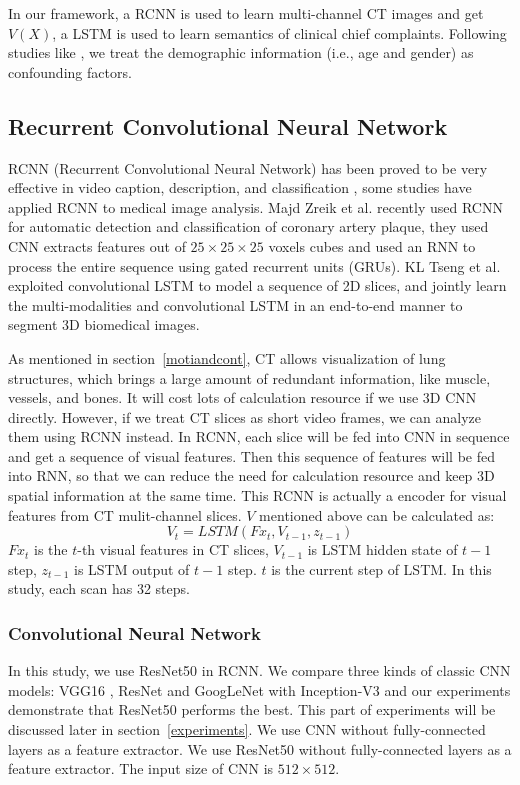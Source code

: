 \documentclass[journal]{IEEEtran}
\begin{document}
In our framework, a RCNN is used to learn multi-channel CT images and get $V(X)$, a LSTM is used to learn semantics of clinical chief complaints.
Following studies like \cite{dukart2011age, de2016machine}, we treat the demographic information (i.e., age and gender) as confounding factors.

\subsection{Recurrent Convolutional Neural Network}
RCNN (Recurrent Convolutional Neural Network) has been proved to be very effective in video caption, description, and classification \cite{Donahue2015Long, Aafaq2019Spatio}, some studies have applied RCNN to medical image analysis. Majd Zreik et al. \cite{Zreik2018A} recently used RCNN for automatic detection and classification of coronary artery plaque, they used CNN extracts features out of $ 25\times25\times25$ voxels cubes and used an RNN to process the entire sequence using gated recurrent units (GRUs)\cite{chung2014empirical}. KL Tseng et al. \cite{tseng2017joint} exploited convolutional LSTM to model a sequence of 2D slices, and jointly learn the multi-modalities and convolutional LSTM in an end-to-end manner to segment 3D biomedical images.

As mentioned in section~\ref{motiandcont}, CT allows visualization of lung structures, which brings a large amount of redundant information, like muscle, vessels, and bones. It will cost lots of calculation resource if we use 3D CNN directly. However, if we treat CT slices as short video frames, we can analyze them using RCNN instead. In RCNN, each slice will be fed into CNN in sequence and get a sequence of visual features. Then this sequence of features will be fed into RNN, so that we can reduce the need for calculation resource and keep 3D spatial information at the same time. 
This RCNN is actually a encoder for visual features from CT mulit-channel slices.
$V$ mentioned above can be calculated as:
\begin{equation}
    V_t = LSTM(Fx_t, V_{t-1}, z_{t-1})
\end{equation}
$Fx_t$ is the $t$-th visual features in CT slices, $V_{t-1}$ is LSTM hidden state of $t-1$ step, $z_{t-1}$ is LSTM output of $t-1$ step. $t$ is the current step of LSTM. In this study, each scan has 32 steps.

\subsubsection{Convolutional Neural Network}
In this study, we use ResNet50 in RCNN. We compare three kinds of classic CNN models: VGG16 \cite{simonyan2015very}, ResNet \cite{he2016deep} and GoogLeNet with Inception-V3 \cite{szegedy2016rethinking} and our experiments demonstrate that ResNet50 performs the best. This part of experiments will be discussed later in section~\ref{experiments}. We use CNN without fully-connected layers as a feature extractor. We use ResNet50 without fully-connected layers as a feature extractor. The input size of CNN is $512 \times 512$.
\end{document}
